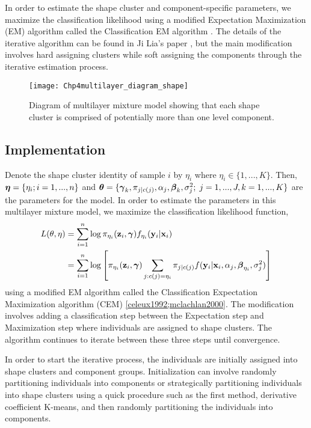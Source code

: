 In order to estimate the shape cluster and component-specific parameters, we maximize the classification likelihood using a modified Expectation Maximization (EM) algorithm \cite{dempster1977} called the Classification EM algorithm \cite{mclachlan2000}. The details of the iterative algorithm can be found in Ji Lia's paper \cite{li2005}, but the main modification involves hard assigning clusters while soft assigning the components through the iterative estimation process.
\begin{figure}[h]
\begin{center}
\texttt{[image: Chp4multilayer\_diagram\_shape]}
\end{center}
\label{fig:diashape}
\caption{Diagram of multilayer mixture model showing that each shape cluster is comprised of potentially more than one level component.}
\end{figure}
\subsection{Implementation}
Denote the shape cluster identity of sample $i$ by $\eta_{i}$ where $\eta_{i}\in\{1,...,K\}$. Then, $\boldsymbol\eta = \{\eta_{i}; i=1,...,n\}$ and $\boldsymbol\theta=\{\boldsymbol \gamma_{k}, \pi_{j|c(j)},\alpha_{j}, \boldsymbol\beta_{k},\sigma^{2}_{j};\; j=1,...,J, k=1,...,K\}$ are the parameters for the model. In order to estimate the parameters in this multilayer mixture model, we maximize the classification likelihood function, \cite{mclachlan2000}
\begin{align}
 L(\theta,\eta) &= \sum^{n}_{i=1} \log \pi_{\eta_{i}}(\mathbf z_{i},\boldsymbol\gamma) f_{\eta_{i}}(\mathbf y_{i}|\mathbf x_{i})\\
\label{ll}& =  \sum^{n}_{i=1} \log\left[ \pi_{\eta_{i}}(\mathbf z_{i},\boldsymbol\gamma)  \sum_{j: c(j) = \eta_{i}} \pi_{j|c(j)}f(\mathbf y_{i}|\mathbf x_{i},\alpha_{j},\boldsymbol\beta_{\eta_{i}},\sigma^{2}_{j})\right]
\end{align} 
using a modified EM algorithm called the Classification Expectation Maximization algorithm (CEM) \ref{celeux1992;mclachlan2000}. The modification involves adding a classification step between the Expectation step and Maximization step where individuals are assigned to shape clusters. The algorithm continues to iterate between these three steps until convergence.

In order to start the iterative process, the individuals are initially assigned into shape clusters and component groups. Initialization can involve randomly partitioning individuals into components or strategically partitioning individuals into shape clusters using a quick procedure such as the first method, derivative coefficient K-means, and then randomly partitioning the individuals into components. 

